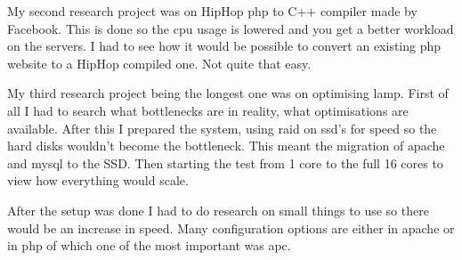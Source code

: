 My second research project was on HipHop \gls{php} to C++ compiler made by Facebook. This is done so the \gls{cpu} usage is lowered and you get a better workload on the servers.
I had to see how it would be possible to convert an existing \gls{php} website to a HipHop compiled one. Not quite that easy.

My third research project being the longest one was on optimising \gls{lamp}. 
First of all I had to search what bottlenecks are in reality, what optimisations are available.
After this I prepared the system, using \gls{raid} on \gls{ssd}'s for speed so the hard disks wouldn't become the bottleneck. 
This meant the migration of \gls{apache} and \gls{mysql} to the SSD.
Then starting the test from 1 core to the full 16 cores to view how everything would scale.

After the setup was done I had to do research on small things to use so there would be an increase in speed.
Many configuration options are either in \gls{apache} or in \gls{php} of which one of the most important was \gls{apc}.


\pagestyle{fancy}
\begin{comment}
\renewcommand{\chaptermark}[1]{%
\markboth{#1}{}}
\renewcommand{\sectionmark}[1]{%
\markright{\thesection\ #1}}
\fancyhf{} %
\fancyhead[LE,RO]{\bfseries\thepage}
\fancyhead[LO]{\bfseries\rightmark}
\fancyhead[RE]{\bfseries\leftmark}
\renewcommand{\headrulewidth}{0.5pt}
\renewcommand{\footrulewidth}{0pt}
\addtolength{\headheight}{0.5pt} %
\fancypagestyle{plain}{%
	\fancyhead{} %
	\renewcommand{\headrulewidth}{0pt} %
}
\end{comment}










